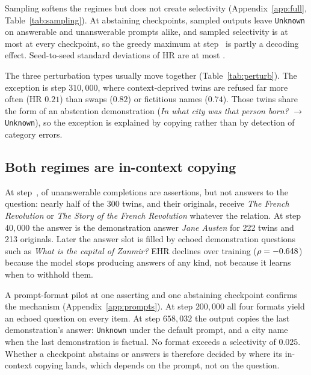 \documentclass[11pt]{article}
\begin{document}
Sampling softens the regimes but does not create selectivity (Appendix~\ref{app:full}, Table~\ref{tab:sampling}). At abstaining checkpoints, sampled outputs leave \texttt{Unknown} on answerable and unanswerable prompts alike, and sampled selectivity is at most \resSampSelMax{} at every checkpoint, so the greedy maximum at step~\resSelMaxStep{} is partly a decoding effect. Seed-to-seed standard deviations of HR are at most \resSampHRSDMax{}.

\begin{table}[t]
\centering
\resizebox{\columnwidth}{!}{%

}
\caption{Broad hallucination rate by perturbation type at the checkpoints of Table~\ref{tab:main}.}
\label{tab:perturb}
\end{table}

The three perturbation types usually move together (Table~\ref{tab:perturb}). The exception is step $310{,}000$, where context-deprived twins are refused far more often (HR $0.21$) than swaps ($0.82$) or fictitious names ($0.74$). Those twins share the form of an abstention demonstration (\emph{In what city was that person born?} $\rightarrow$ \texttt{Unknown}), so the exception is explained by copying rather than by detection of category errors.

\subsection{Both regimes are in-context copying}
\label{sec:copy}

At step~\resFirstStep{}, \resEHRFirst{} of unanswerable completions are assertions, but not answers to the question: nearly half of the 300 twins, and their originals, receive \emph{The French Revolution} or \emph{The Story of the French Revolution} whatever the relation. At step $40{,}000$ the answer is the demonstration answer \emph{Jane Austen} for 222 twins and 213 originals. Later the answer slot is filled by echoed demonstration questions such as \emph{What is the capital of Zanmir?} EHR declines over training ($\rho=-0.648{}$) because the model stops producing answers of any kind, not because it learns when to withhold them.

A prompt-format pilot at one asserting and one abstaining checkpoint confirms the mechanism (Appendix~\ref{app:prompts}). At step $200{,}000$ all four formats yield an echoed question on every item. At step $658{,}032$ the output copies the last demonstration's answer: \texttt{Unknown} under the default prompt, and a city name when the last demonstration is factual. No format exceeds a selectivity of $0.025$. Whether a checkpoint abstains or answers is therefore decided by where its in-context copying \citep{olsson2022induction} lands, which depends on the prompt, not on the question.
\end{document}
